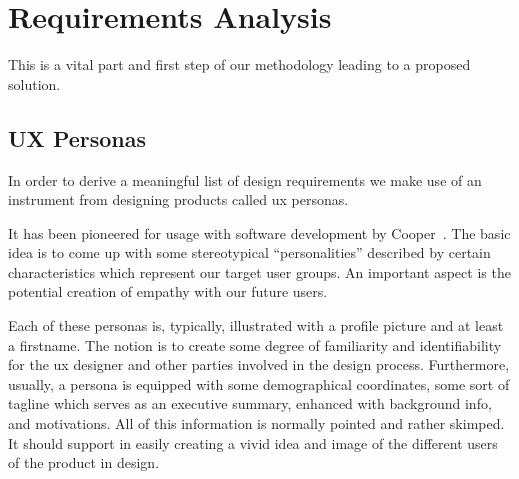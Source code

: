 

\section{Requirements Analysis}

This is a vital part and first step of our methodology leading to a proposed solution.


\subsection{UX Personas}

In order to derive a meaningful list of design requirements we make use of an instrument from designing products called \gls{ux} personas.

It has been pioneered for usage with software development by Cooper~\cite{Cooper2004}. The basic idea is to come up with some stereotypical ``personalities'' described by certain characteristics which represent our target user groups.
An important aspect is the potential creation of empathy with our future users.

Each of these personas is, typically, illustrated with a profile picture and at least a firstname.
The notion is to create some degree of familiarity and identifiability for the \gls{ux} designer and other parties involved in the design process.
Furthermore, usually, a persona is equipped with some demographical coordinates, some sort of tagline which serves as an executive summary, enhanced with background info, and motivations.
All of this information is normally pointed and rather skimped.
It should support in easily creating a vivid idea and image of the different users of the product in design.

